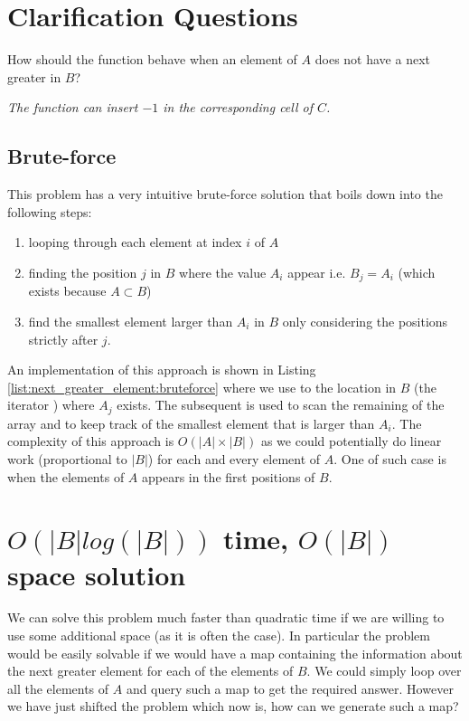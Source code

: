 \section{Clarification Questions}

\begin{QandA}
	\item How should the function behave when an element of $A$ does not have a next greater in $B$?
	\begin{answered}
		\textit{The function can insert $-1$ in the corresponding cell of $C$.}
	\end{answered}
	
\end{QandA}

\subsection{Brute-force}
\label{next_greater_element:sec:bruteforce}
This problem has a very intuitive brute-force solution that boils down into the following steps:
\begin{enumerate}
	\item looping through each element at index $i$ of $A$
	\item finding the position $j$ in $B$ where the value $A_i$ appear i.e. $B_j = A_i$ (which
	exists because $A \subset B$)
	\item find the smallest element larger than $A_i$ in $B$ only considering the positions strictly
	after $j$.
\end{enumerate}
An implementation of this approach is shown in Listing \ref{list:next_greater_element:bruteforce}
where we use  to the location in $B$ (the iterator ) where $A_j$
exists. The subsequent  is used to scan the remaining of the array and to keep track
of the smallest element that is larger than $A_i$. The complexity of this approach is $O(|A| \times
|B|)$ as we could potentially do linear  work (proportional to $|B|$) for each and every element of
$A$. One of such case is when the elements of $A$ appears in the first positions of $B$. 



\section{$O(|B|log(|B|))$ time, $O(|B|)$ space solution}
\label{next_greater_element:sec:nlogntime}
We can solve this problem much faster than quadratic time if we are willing to use some additional
space (as it is often the case). In particular the problem would be easily solvable if we would have
a map containing the information about the next greater element for each of the elements of $B$. We
could simply loop over all the elements of $A$ and query such a map to get the required answer.
However we have just shifted the problem which now is, how can we generate such a map?

